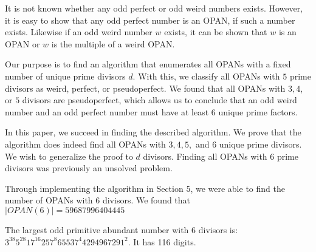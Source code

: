 \documentclass[../paper.tex]{article}
\begin{document}
It is not known whether any odd perfect or odd weird numbers
exists. However, it is easy to show that any odd perfect number is
an OPAN, if such a number exists. Likewise if an odd weird number
$w$ exists, it can be shown that $w$ is an OPAN or $w$ is the
multiple of a weird OPAN.

Our purpose is to find an algorithm that enumerates all OPANs
with a fixed number of unique prime divisors $d$. With this, we
classify all OPANs with $5$ prime divisors as weird, perfect, or pseudoperfect.
We found that all OPANs with $3, 4$, or $5$ divisors are pseudoperfect,
which allows us to conclude that an odd weird number and an odd perfect number must have at least $6$ unique prime factors.

In this paper, we succeed in finding the described algorithm. 
We prove that the algorithm does indeed find all OPANs with $3, 4, 5, $ and $6$
unique prime divisors. We wish to generalize the proof to $d$ divisors.
Finding all OPANs with $6$ prime divisors 
was previously an unsolved problem\cite{amato}.

Through implementing the algorithm in Section 5, we were able to find the
number of OPANs with 6 divisors. We found that $|OPAN(6)| = 59687996404445$


The largest odd primitive abundant number with 6 divisors is:
$3^{38} 5^{28} 17^{16} 257^8 65537^4 4294967291^2$. It has 116 digits.





\end{document}
